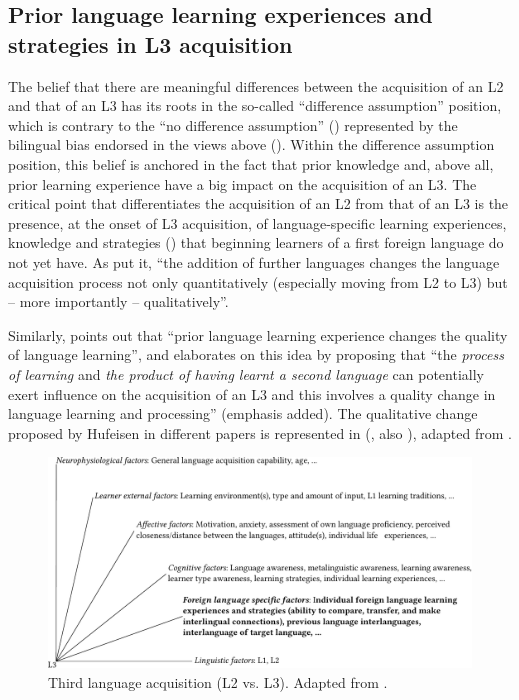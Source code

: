 \documentclass[output=paper]{../langscibook}
\begin{document}
\subsection{Prior language learning experiences and strategies in L3 acquisition}\label{sec:sanchez1:1.1}

The belief that there are meaningful differences between the acquisition of an L2 and that of an L3 has its roots in the so-called “difference assumption” position, which is contrary to the “no difference assumption” (\citealt{DeAngelis2007}) represented by the bilingual bias endorsed in the views above (\citealt{SharwoodSmith1994, MitchellMyles1998, Grosjean2010}). Within the difference assumption position, this belief is anchored in the fact that prior knowledge and, above all, prior learning experience have a big impact on the acquisition of an L3. The critical point that differentiates the acquisition of an L2 from that of an L3 is the presence, at the onset of L3 acquisition, of language-specific learning experiences, knowledge and strategies (\citealt{GibsonHufeisen2003}) that beginning learners of a first foreign language do not yet have. As \citet[145]{MarxHufeisen2004} put it, “the addition of further languages changes the language acquisition process not only quantitatively (especially moving from L2 to L3) but – more importantly – qualitatively”.

Similarly, \citet[207]{Jessner1999} points out that “prior language learning experience changes the quality of language learning”, and \citet[14]{Jessner2006} elaborates on this idea by proposing that “the \textit{process of learning} and \textit{the product of having learnt a second language} can potentially exert influence on the acquisition of an L3 and this involves a quality change in language learning and processing” (emphasis added). The qualitative change proposed by Hufeisen in different papers is represented in  (\citealt{Hufeisen1998}, also \citealt[145]{MarxHufeisen2004}), adapted from \citet[314]{HufeisenMarx2007}.

\begin{figure}
    \includegraphics[width=\textwidth]{figures/Sanchez1Figure1.pdf}
    \caption{Third language acquisition (L2 vs. L3). Adapted from \citealt[314, Figure~2]{HufeisenMarx2007}.\label{fig:sanchez1:1}}
\end{figure}
\end{document}
